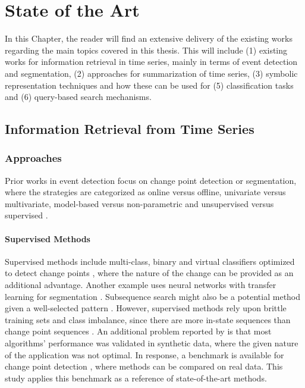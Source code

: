 
%

\chapter{State of the Art}
\label{cha:stateofart}

In this Chapter, the reader will find an extensive delivery of the existing works regarding the main topics covered in this thesis. This will include (1) existing works for information retrieval in time series, mainly in terms of event detection and segmentation, (2) approaches for summarization of time series, (3) symbolic representation techniques and how these can be used for (5) classification tasks and (6) query-based search mechanisms.

\section{Information Retrieval from Time Series} %
\label{sec:if_timeseries}

\subsection{Approaches}

Prior works in event detection focus on change point detection or segmentation, where the strategies are categorized as online versus offline, univariate versus multivariate, model-based versus non-parametric and unsupervised versus supervised \cite{cpd_alan, review_1, review_2}.

\subsubsection{Supervised Methods}

Supervised methods include multi-class, binary and virtual classifiers optimized to detect change points \cite{review_cpd_1}, where the nature of the change can be provided as an additional advantage. Another example uses neural networks with transfer learning for segmentation \cite{pedromatias}. Subsequence search might also be a potential method given a well-selected pattern \cite{folgado2022tssearch}. However, supervised methods rely upon brittle training sets and class imbalance, since there are more in-state sequences than change point sequences \cite{review_cpd_1}. An additional problem reported by \cite{cpd_alan} is that most algorithms' performance was validated in synthetic data, where the given nature of the application was not optimal. In response, a benchmark is available for change point detection \cite{cpd_alan}, where methods can be compared on real data. This study applies this benchmark as a reference of state-of-the-art methods.

